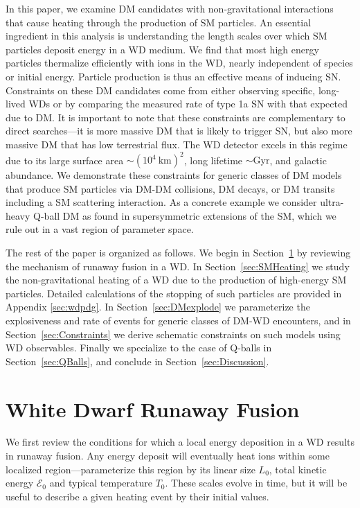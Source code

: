 \documentclass[twocolumn, preprintnumbers,amsmath,amssymb,prd, superscriptaddress]{revtex4}
\newcommand{\Ez}{\mathcal{E}_0}
\begin{document}
In this paper, we examine DM candidates with non-gravitational interactions that cause heating through the production of SM particles.
An essential ingredient in this analysis is understanding the length scales over which SM particles deposit energy in a WD medium.
We find that most high energy particles thermalize efficiently with ions in the WD, nearly independent of species or initial energy.
Particle production is thus an effective means of inducing SN.
Constraints on these DM candidates come from either observing specific, long-lived WDs or by comparing the measured rate of type 1a SN with that expected due to DM.
It is important to note that these constraints are complementary to direct searches---it is more massive DM that is likely to trigger SN, but also more massive DM that has low terrestrial flux.
The WD detector excels in this regime due to its large surface area $\sim (10^4 ~\text{km})^2$, long lifetime $\sim \text{Gyr}$, and galactic abundance.
We demonstrate these constraints for generic classes of DM models that produce SM particles via DM-DM collisions, DM decays, or DM transits including a SM scattering interaction.
As a concrete example we consider ultra-heavy Q-ball DM as found in supersymmetric extensions of the SM, which we rule out in a vast region of parameter space.

The rest of the paper is organized as follows.
We begin in Section~\ref{sec:Review} by reviewing the mechanism of runaway fusion in a WD.
In Section~\ref{sec:SMHeating} we study the non-gravitational heating of a WD due to the production of high-energy SM particles.
Detailed calculations of the stopping of such particles are provided in Appendix \ref{sec:wdpdg}.
In Section~\ref{sec:DMexplode} we parameterize the explosiveness and rate of events for generic classes of DM-WD encounters, and in Section~\ref{sec:Constraints} we derive schematic constraints on such models using WD observables.
Finally we specialize to the case of Q-balls in Section~\ref{sec:QBalls}, and conclude in Section~\ref{sec:Discussion}.

\section{White Dwarf Runaway Fusion}
\label{sec:Review}

We first review the conditions for which a local energy deposition in a WD results in runaway fusion.
Any energy deposit will eventually heat ions within some localized region---parameterize this region by its linear size $L_0$, total kinetic energy $\Ez$ and typical temperature $T_0$.
These scales evolve in time, but it will be useful to describe a given heating event by their initial values.
\end{document}
